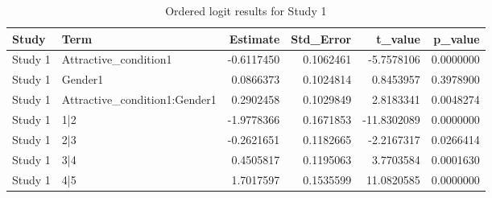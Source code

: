 \begin{table}

\caption{Ordered logit results for Study 1}
\centering
\begin{tabular}[t]{llrrrr}
\toprule
Study & Term & Estimate & Std\_Error & t\_value & p\_value\\
\midrule
Study 1 & Attractive\_condition1 & -0.6117450 & 0.1062461 & -5.7578106 & 0.0000000\\
Study 1 & Gender1 & 0.0866373 & 0.1024814 & 0.8453957 & 0.3978900\\
Study 1 & Attractive\_condition1:Gender1 & 0.2902458 & 0.1029849 & 2.8183341 & 0.0048274\\
Study 1 & 1|2 & -1.9778366 & 0.1671853 & -11.8302089 & 0.0000000\\
Study 1 & 2|3 & -0.2621651 & 0.1182665 & -2.2167317 & 0.0266414\\
\addlinespace
Study 1 & 3|4 & 0.4505817 & 0.1195063 & 3.7703584 & 0.0001630\\
Study 1 & 4|5 & 1.7017597 & 0.1535599 & 11.0820585 & 0.0000000\\
\bottomrule
\end{tabular}
\end{table}
